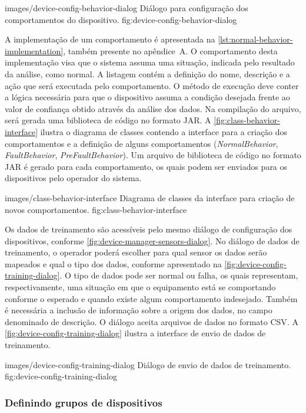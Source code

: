   {images/device-config-behavior-dialog}
  {Diálogo para configuração dos comportamentos do dispositivo.}
  {fig:device-config-behavior-dialog}

A implementação de um comportamento é apresentada na \cref{lst:normal-behavior-implementation},
também presente no apêndice~A. O comportamento desta implementação visa que o sistema assuma uma
situação, indicada pelo resultado da análise, como normal. A listagem contém a definição do nome,
descrição e a ação que será executada pelo comportamento. O método de execução deve conter a lógica
necessária para que o dispositivo assuma a condição desejada frente ao valor de confiança obtido
através da análise dos dados. Na compilação do arquivo, será gerada uma biblioteca de código no
formato \gls{JAR}. A \cref{fig:class-behavior-interface} ilustra o diagrama de classes contendo a
interface para a criação dos comportamentos e a definição de alguns comportamentos
(\emph{NormalBehavior}, \emph{FaultBehavior}, \emph{PreFaultBehavior}). Um arquivo de biblioteca de
código no formato \gls{JAR} é gerado para cada comportamento, os quais podem ser enviados para os
dispositivos pelo operador do sistema.

  {images/class-behavior-interface}
  {Diagrama de classes da interface para criação de novos comportamentos.}
  {fig:class-behavior-interface}

Os dados de treinamento são acessíveis pelo mesmo diálogo de configuração dos dispositivos, conforme
\cref{fig:device-manager-sensors-dialog}. No diálogo de dados de treinamento, o operador poderá
escolher para qual sensor os dados serão mapeados e qual o tipo dos dados, conforme apresentado na
\cref{fig:device-config-training-dialog}. O tipo de dados pode ser normal ou falha, os quais
representam, respectivamente, uma situação em que o equipamento está se comportando conforme o
esperado e quando existe algum comportamento indesejado. Também é necessária a inclusão de
informação sobre a origem dos dados, no campo denominado de descrição. O diálogo aceita arquivos de
dados no formato \gls{CSV}. A \cref{fig:device-config-training-dialog} ilustra a interface de envio
de dados de treinamento.

  {images/device-config-training-dialog}
  {Diálogo de envio de dados de treinamento.}
  {fig:device-config-training-dialog}


\subsubsection{Definindo grupos de dispositivos}

